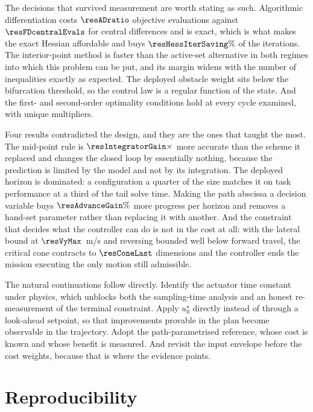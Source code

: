 \documentclass[11pt,a4paper]{article}
\begin{document}
The decisions that survived measurement are worth stating as such. Algorithmic differentiation costs
$\resADratio$ objective evaluations against $\resFDcentralEvals$ for central differences and is exact, which
is what makes the exact Hessian affordable and buys $\resHessIterSaving\%$ of the iterations. The
interior-point method is faster than the active-set alternative in both regimes into which this problem can
be put, and its margin widens with the number of inequalities exactly as expected. The deployed obstacle
weight sits below the bifurcation threshold, so the control law is a regular function of the state. And the
first- and second-order optimality conditions hold at every cycle examined, with unique multipliers.

Four results contradicted the design, and they are the ones that taught the most. The mid-point rule is
$\resIntegratorGain\times$ more accurate than the scheme it replaced and changes the closed loop by
essentially nothing, because the prediction is limited by the model and not by its integration. The deployed
horizon is dominated: a configuration a quarter of the size matches it on task performance at a third of the
tail solve time. Making the path abscissa a decision variable buys $\resAdvanceGain\%$ more progress per
horizon and removes a hand-set parameter rather than replacing it with another. And the constraint that
decides what the controller can do is not in the cost at all: with the lateral bound at $\resVyMax$~m/s and
reversing bounded well below forward travel, the critical cone contracts to $\resConeLast$ dimensions and
the controller ends the
mission executing the only motion still admissible.

The natural continuations follow directly. Identify the actuator time constant under physics, which unblocks
both the sampling-time analysis and an honest re-measurement of the terminal constraint. Apply $u^\star_0$
directly instead of through a look-ahead setpoint, so that improvements provable in the plan become
observable in the trajectory. Adopt the path-parametrised reference, whose cost is known and whose benefit is
measured. And revisit the input envelope before the cost weights, because that is where the evidence points.

\section*{Reproducibility}
\end{document}
